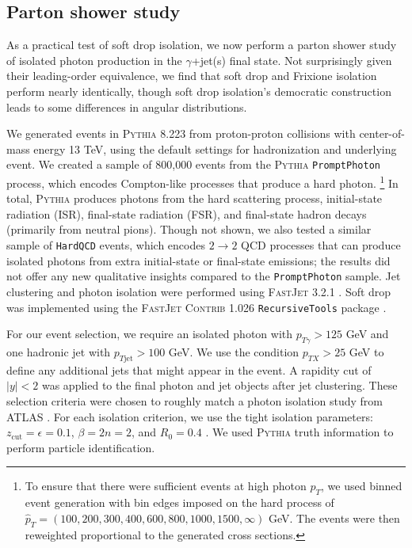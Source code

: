 \documentclass[a4paper,11pt]{article}
\begin{document}
\subsection{Parton shower study}
\label{sec:2.4}
 
As a practical test of soft drop isolation, we now perform a parton shower study of isolated photon production in the $\gamma$+jet(s) final state.
%
Not surprisingly given their leading-order equivalence, we find that soft drop and Frixione isolation perform nearly identically, though soft drop isolation's democratic construction leads to some differences in angular distributions.

We generated events in \textsc{Pythia} 8.223 \cite{Sjostrand:2006za,Sjostrand:2014zea} from proton-proton collisions with center-of-mass energy 13 TeV, using the default settings for hadronization and underlying event.
%
We created a sample of 800,000 events from the \textsc{Pythia} \texttt{PromptPhoton} process, which encodes Compton-like processes that produce a hard photon.%
\footnote{To ensure that there were sufficient events at high photon ${p}_T$, we used binned event generation with bin edges imposed on the hard process of $\hat{p}_T = (100,200,300,400,600,800,1000,1500,\infty)$ GeV.  The events were then reweighted proportional to the generated cross sections.}
%
In total, \textsc{Pythia} produces photons from the hard scattering process, initial-state radiation (ISR), final-state radiation (FSR), and final-state hadron decays (primarily from neutral pions).
%
Though not shown, we also tested a similar sample of \texttt{HardQCD} events, which encodes $2 \rightarrow 2$ QCD processes that can produce isolated photons from extra initial-state or final-state emissions; the results did not offer any new qualitative insights compared to the \texttt{PromptPhoton} sample.
%
Jet clustering and photon isolation were performed using \textsc{FastJet} 3.2.1 \cite{Cacciari:2011ma}.
%
Soft drop was implemented using the \textsc{FastJet Contrib} 1.026 \texttt{RecursiveTools} package \cite{fastjetcontrib}.

For our event selection, we require an isolated photon with $p_{T\gamma} > 125$ GeV and one hadronic jet with $p_{T\text{jet}} > 100$ GeV.
%
We use the condition $p_{T X} > 25$ GeV to define any additional jets that might appear in the event.
%
A rapidity cut of $|y| < 2$ was applied to the final photon and jet objects after jet clustering.
%
These selection criteria were chosen to roughly match a photon isolation study from ATLAS \cite{Aaboud:2017kff}.
%
For each isolation criterion, we use the tight isolation parameters: $z_{\text{cut}} = \epsilon = 0.1$, $\beta = 2n = 2$, and $R_0 = 0.4$ \cite{Andersen:2014efa}. 
%
We used \textsc{Pythia} truth information to perform particle identification.
\end{document}
